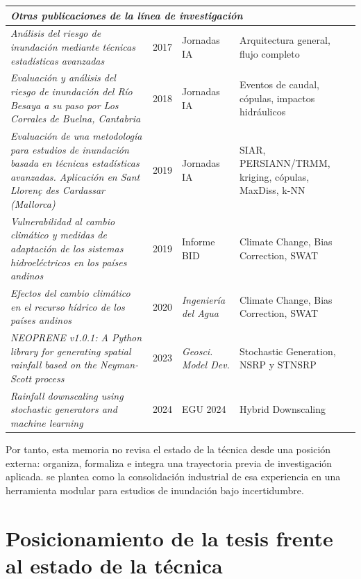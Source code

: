 \begin{longtable}{p{}p{}p{}p{}}
  \midrule
  \multicolumn{4}{l}{\textit{Otras publicaciones de la línea de investigación}} \\
  \midrule
  \textit{Análisis del riesgo de inundación mediante técnicas estadísticas avanzadas} \parencite{navas2017jia} & 2017 & Jornadas IA & Arquitectura general, flujo completo \\[4pt]
  \textit{Evaluación y análisis del riesgo de inundación del Río Besaya a su paso por Los Corrales de Buelna, Cantabria} \parencite{navas2018besaya} & 2018 & Jornadas IA & Eventos de caudal, cópulas, impactos hidráulicos \\[4pt]
  \textit{Evaluación de una metodología para estudios de inundación basada en técnicas estadísticas avanzadas. Aplicación en Sant Llorenç des Cardassar (Mallorca)} \parencite{navas2019mallorca} & 2019 & Jornadas IA & SIAR, PERSIANN/TRMM, kriging, cópulas, MaxDiss, k-NN \\[4pt]
  \textit{Vulnerabilidad al cambio climático y medidas de adaptación de los sistemas hidroeléctricos en los países andinos} \parencite{paz2019idb} & 2019 & Informe BID & Climate Change, Bias Correction, SWAT \\[4pt]
  \textit{Efectos del cambio climático en el recurso hídrico de los países andinos} \parencite{deljesus2020andinos} & 2020 & \textit{Ingeniería del Agua} & Climate Change, Bias Correction, SWAT \\[4pt]
  \textit{NEOPRENE v1.0.1: A Python library for generating spatial rainfall based on the Neyman-Scott process} \parencite{diezsierra2023neoprene} & 2023 & \textit{Geosci. Model Dev.} & Stochastic Generation, NSRP y STNSRP \\[4pt]
  \textit{Rainfall downscaling using stochastic generators and machine learning} \parencite{deljesus2024downscaling} & 2024 & EGU 2024 & Hybrid Downscaling \\
  \bottomrule
\end{longtable}

Por tanto, esta memoria no revisa el estado de la técnica desde una posición externa: organiza, formaliza e integra una trayectoria previa de investigación aplicada. \hydra se plantea como la consolidación industrial de esa experiencia en una herramienta modular para estudios de inundación bajo incertidumbre.

\section{Posicionamiento de la tesis frente al estado de la técnica}
\label{sec:posicionamiento}

